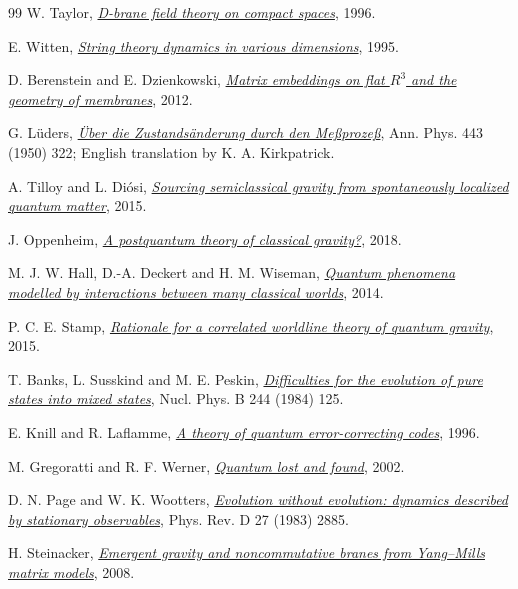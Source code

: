 \begin{thebibliography}{99}
 W. Taylor, \href{https://arxiv.org/abs/hep-th/9611042}{\emph{D-brane field theory on compact spaces}}, 1996.

 E. Witten, \href{https://arxiv.org/abs/hep-th/9503124}{\emph{String theory dynamics in various dimensions}}, 1995.

 D. Berenstein and E. Dzienkowski, \href{https://arxiv.org/abs/1204.2788}{\emph{Matrix embeddings on flat \(R^3\) and the geometry of membranes}}, 2012.

 G. L\"uders, \href{https://arxiv.org/abs/quant-ph/0403007}{\emph{\"Uber die Zustands\"anderung durch den Me\ss proze\ss}}, Ann. Phys. 443 (1950) 322; English translation by K. A. Kirkpatrick.

 A. Tilloy and L. Di\'osi, \href{https://arxiv.org/abs/1509.08705}{\emph{Sourcing semiclassical gravity from spontaneously localized quantum matter}}, 2015.

 J. Oppenheim, \href{https://arxiv.org/abs/1811.03116}{\emph{A postquantum theory of classical gravity?}}, 2018.

 M. J. W. Hall, D.-A. Deckert and H. M. Wiseman, \href{https://arxiv.org/abs/1402.6144}{\emph{Quantum phenomena modelled by interactions between many classical worlds}}, 2014.

 P. C. E. Stamp, \href{https://arxiv.org/abs/1506.05065}{\emph{Rationale for a correlated worldline theory of quantum gravity}}, 2015.

 T. Banks, L. Susskind and M. E. Peskin, \href{https://doi.org/10.1016/0550-3213(84)90184-6}{\emph{Difficulties for the evolution of pure states into mixed states}}, Nucl. Phys. B 244 (1984) 125.

 E. Knill and R. Laflamme, \href{https://arxiv.org/abs/quant-ph/9604034}{\emph{A theory of quantum error-correcting codes}}, 1996.

 M. Gregoratti and R. F. Werner, \href{https://arxiv.org/abs/quant-ph/0209025}{\emph{Quantum lost and found}}, 2002.

 D. N. Page and W. K. Wootters, \href{https://doi.org/10.1103/PhysRevD.27.2885}{\emph{Evolution without evolution: dynamics described by stationary observables}}, Phys. Rev. D 27 (1983) 2885.

 H. Steinacker, \href{https://arxiv.org/abs/0806.2032}{\emph{Emergent gravity and noncommutative branes from Yang--Mills matrix models}}, 2008.


\end{thebibliography}

